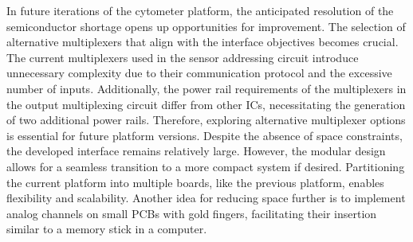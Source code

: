 In future iterations of the cytometer platform, the anticipated resolution of the semiconductor shortage opens up opportunities for improvement. The selection of alternative multiplexers that align with the interface objectives becomes crucial. The current multiplexers used in the sensor addressing circuit introduce unnecessary complexity due to their communication protocol and the excessive number of inputs. Additionally, the power rail requirements of the multiplexers in the output multiplexing circuit differ from other \ac{IC}s, necessitating the generation of two additional power rails. Therefore, exploring alternative multiplexer options is essential for future platform versions. Despite the absence of space constraints, the developed interface remains relatively large. However, the modular design allows for a seamless transition to a more compact system if desired. Partitioning the current platform into multiple boards, like the previous platform, enables flexibility and scalability. Another idea for reducing space further is to implement analog channels on small \ac{PCB}s with gold fingers, facilitating their insertion similar to a memory stick in a computer.


\clearpage
\thispagestyle{empty}
\cleardoublepage